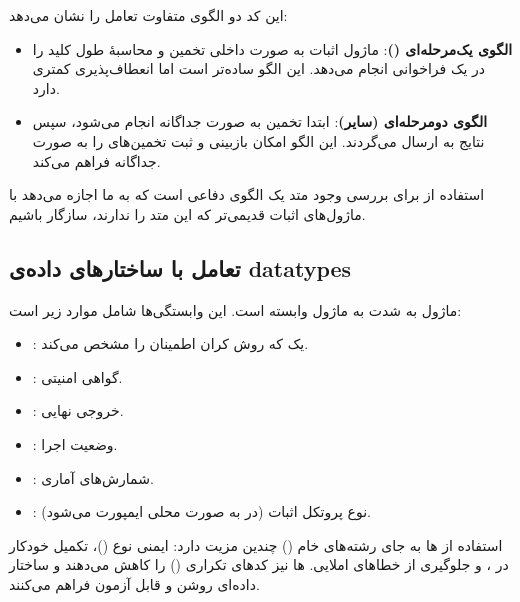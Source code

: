 \noindent این کد دو الگوی متفاوت تعامل را نشان می‌دهد:

\begin{itemize}
	\item \textbf{الگوی یک‌مرحله‌ای ()}: ماژول اثبات به صورت داخلی تخمین  و محاسبۀ طول کلید را در یک فراخوانی انجام می‌دهد. این الگو ساده‌تر است اما انعطاف‌پذیری کمتری دارد.
	\item \textbf{الگوی دومرحله‌ای (سایر)}: ابتدا تخمین  به صورت جداگانه انجام می‌شود، سپس نتایج به  ارسال می‌گردند. این الگو امکان بازبینی و ثبت تخمین‌های  را به صورت جداگانه فراهم می‌کند.
\end{itemize}

استفاده از  برای بررسی وجود متد  یک الگوی دفاعی است که به ما اجازه می‌دهد با ماژول‌های اثبات قدیمی‌تر که این متد را ندارند، سازگار باشیم.

\subsection{تعامل با ساختارهای داده‌ی datatypes}

ماژول  به شدت به ماژول  وابسته است. این وابستگی‌ها شامل موارد زیر است:

\begin{itemize}
	\item {}: یک  که روش کران اطمینان را مشخص می‌کند.
	\item {}:  گواهی امنیتی.
	\item {}:  خروجی نهایی.
	\item {}:  وضعیت اجرا.
	\item {}:  شمارش‌های آماری.
	\item {}:  نوع پروتکل اثبات (در  به صورت محلی ایمپورت می‌شود).
\end{itemize}

استفاده از ‌ها به جای رشته‌های خام () چندین مزیت دارد: ایمنی نوع ()، تکمیل خودکار در ، و جلوگیری از خطاهای املایی. ‌ها نیز کدهای تکراری () را کاهش می‌دهند و ساختار داده‌ای روشن و قابل آزمون فراهم می‌کنند.

